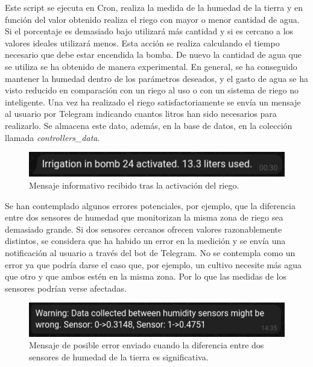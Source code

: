 \documentclass[a4paper, 12pt, oneside]{book}
\begin{document}
Este script se ejecuta en Cron, realiza la medida de la humedad de la tierra y en función del valor obtenido realiza el riego con mayor o menor cantidad de agua. Si el porcentaje es demasiado bajo utilizará más cantidad y si es cercano a los valores ideales utilizará menos. Esta acción se realiza calculando el tiempo necesario que debe estar encendida la bomba. De nuevo la cantidad de agua que se utiliza se ha obtenido de manera experimental. En general, se ha conseguido mantener la humedad dentro de los parámetros deseados, y el gasto de agua se ha visto reducido en comparación con un riego al uso o con un sistema de riego no inteligente.
Una vez ha realizado el riego satisfactoriamente se envía un mensaje al usuario por Telegram indicando cuantos litros han sido necesarios para realizarlo. Se almacena este dato, además, en la base de datos, en la colección llamada \textit{controllers\_data}.

\begin{figure}[H]
	\centering
    \includegraphics[width=12cm, keepaspectratio]{img/mensaje_riego}
    \caption{Mensaje informativo recibido tras la activación del riego.}
    \label{figura:mensaje riego}
\end{figure} 

Se han contemplado algunos errores potenciales, por ejemplo, que la diferencia entre dos sensores de humedad que monitorizan la misma zona de riego sea demasiado grande. 
Si dos sensores cercanos ofrecen valores razonablemente distintos, se considera que ha habido un error en la medición y se envía una notificación al usuario a través del bot de Telegram.
No se contempla como un error ya que podría darse el caso que, por ejemplo, un cultivo necesite más agua que otro y que ambos estén en la misma zona. Por lo que las medidas de los sensores podrían verse afectadas.

\begin{figure}[H]
	\centering
    \includegraphics[width=12cm, keepaspectratio]{img/warning_humedad_tierra}
    \caption{Mensaje de posible error enviado cuando la diferencia entre dos sensores de humedad de la tierra es significativa.}
    \label{figura:diferencia de sensores}
\end{figure}
\end{document}
